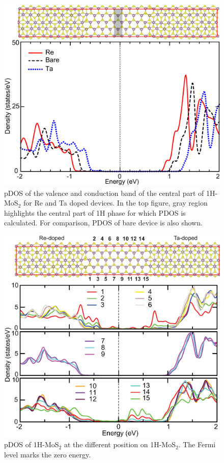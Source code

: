 \begin{figure}[htb]
\centering
\includegraphics[width=0.8\linewidth]{Re1-Ta1-Bare.eps}
\caption{\label{re-ta-bare-dos}pDOS of the valence and conduction band of the central part of 1H-MoS$_2$ for Re and Ta doped devices. In the top figure, gray region highlights  the central part of 1H phase for which PDOS is calculated.  For comparison, PDOS of bare device is also shown.}
\end{figure}

\begin{figure}[htb]
\centering
\includegraphics[width=0.8\linewidth]{pn-doped.eps}
\caption{\label{pn}pDOS of 1H-MoS$_2$ at the different position on 1H-MoS$_2$. 
The Fermi level marks the zero energy.}
\end{figure}



